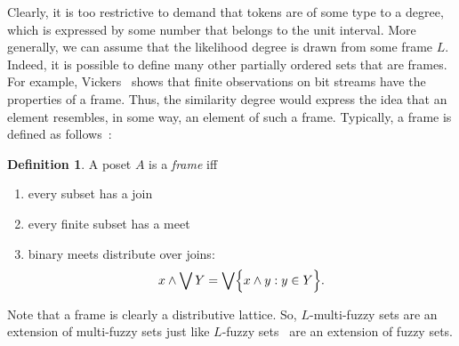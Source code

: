 \documentclass{amsart}
\theoremstyle{definition}
\newtheorem{definition}[theorem]{Definition}
\begin{document}
Clearly, it is too restrictive to demand that tokens are of some type to a
degree, which is expressed by some number that belongs to the unit interval. 
More generally, we can assume that the likelihood degree is drawn from some
frame $L$. Indeed, it is possible to define many other partially ordered sets
that are frames. For example, Vickers~\cite{vickers90} shows that finite
observations on bit streams have the properties of a frame. Thus, the similarity
degree would express the idea that an element resembles, in some way, an element 
of such a frame. Typically, a frame is defined as follows~\cite{vickers90}:
\begin{definition}
A poset $A$ is a {\em frame} iff
\begin{enumerate}
\item every subset has a join
\item every finite subset has a meet
\item binary meets distribute over joins:
\begin{displaymath}
x\wedge\bigvee Y= \bigvee\Bigl\{ x\wedge y: y\in Y\Bigr\}.
\end{displaymath}
\end{enumerate}
\end{definition}
\iffalse
\begin{itemize}
\item $L$ is a nonempty set;
\item $\wedge$ and $\vee$ are binary operations on $L$;
\item  both $\wedge$ and $\vee$ are
   \begin{itemize}
    \item idempotent (i.e., $x\vee x=x$ and $x\wedge x=x$);
    \item commutative (i.e.,$x\wedge y=y\wedge x$ and $x\vee y=y\vee x$);
    \item associative (i.e., $(x\wedge y)\wedge z=x\wedge(y\wedge z)$ and
          $(x\vee y)\vee z=x\vee(y\vee z)$);
    \item distributive (i.e., $(x\wedge y)\vee(x\wedge z)=x\wedge(y\vee z)$ and
          $(x\vee y)\wedge(x\vee z)=x\vee(y\wedge z)$);
    \item and they satisfy the absorption law (i.e., $x\wedge(x\vee y)=
          x\vee(x\wedge y)=x$).
   \end{itemize}
\end{itemize}
\fi
Note that a frame is clearly a distributive lattice.
So, $L$-multi-fuzzy sets are an extension of
multi-fuzzy sets just like $L$-fuzzy sets~\cite{goguen67} are an extension
of fuzzy sets. 
\end{document}
